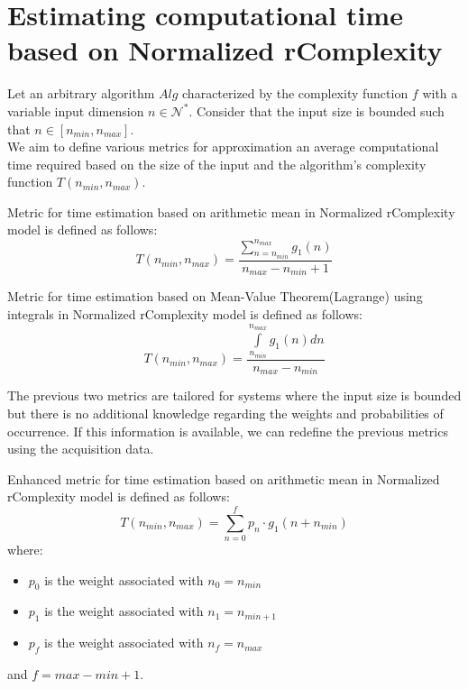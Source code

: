 \section{Estimating computational time based on Normalized rComplexity}
Let an arbitrary algorithm $Alg$ characterized by the complexity function $f$ with a variable input dimension $n \in \mathcal{N}^{*}$. Consider that the input size is bounded such that $n \in [n_{min}, n_{max}]$. \\
We aim to define various metrics for approximation an average computational time required based on the size of the input and the algorithm's complexity function  $T(n_{min}, n_{max})$.\\

\begin{definition} Metric for time estimation based on arithmetic mean in Normalized rComplexity model is defined as follows:
\[  T(n_{min}, n_{max}) = \dfrac{\sum\limits_{n=n_{min}}^{n_{max}} g_{1}(n)}{n_{max} - n_{min} + 1}  \]
\end{definition}

\begin{definition} Metric for time estimation based on Mean-Value Theorem(Lagrange) using integrals in Normalized rComplexity model is defined as follows:
\[  T(n_{min}, n_{max}) = \dfrac{\int\limits_{n_{min}}^{n_{max}} g_{1}(n) dn}{n_{max} - n_{min}}  \]
\end{definition}

The previous two metrics are tailored for systems where the input size is bounded but there is no additional knowledge regarding the weights and probabilities of occurrence. If this information is available, we can redefine the previous metrics using the acquisition data.

\begin{definition} Enhanced metric for time estimation based on arithmetic mean in Normalized rComplexity model is defined as follows:
\[  T(n_{min}, n_{max}) = \sum\limits_{n=0}^{f} p_{n} \cdot g_{1}(n + n_{min})  \]
where:
\begin{itemize}
	\item $p_{0}$ is the weight associated with $n_{0} = n_{min}$
	\item $p_{1}$ is the weight associated with $n_{1} = n_{min + 1}$
	\item $p_{f}$ is the weight associated with $n_{f} = n_{max}$
\end{itemize}
and $f = max - min + 1$.
\end{definition}

